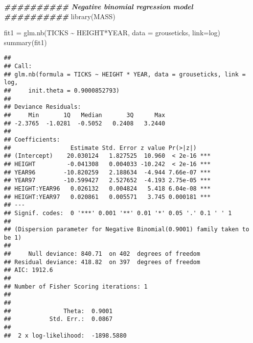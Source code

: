 \documentclass[
]{article}
\newenvironment{Shaded}{\begin{snugshade}}{\end{snugshade}}
\newcommand{\AttributeTok}[1]{\textcolor[rgb]{0.77,0.63,0.00}{#1}}
\newcommand{\CommentTok}[1]{\textcolor[rgb]{0.56,0.35,0.01}{\textit{#1}}}
\newcommand{\DocumentationTok}[1]{\textcolor[rgb]{0.56,0.35,0.01}{\textbf{\textit{#1}}}}
\newcommand{\FunctionTok}[1]{\textcolor[rgb]{0.00,0.00,0.00}{#1}}
\newcommand{\NormalTok}[1]{#1}
\newcommand{\OtherTok}[1]{\textcolor[rgb]{0.56,0.35,0.01}{#1}}
\newcommand{\SpecialCharTok}[1]{\textcolor[rgb]{0.00,0.00,0.00}{#1}}
\begin{document}
\begin{Shaded}
\begin{Highlighting}[]
\DocumentationTok{\#\#\#\#\#\#\#\#\#\# Negative binomial regression model \#\#\#\#\#\#\#\#\#\#}
\FunctionTok{library}\NormalTok{(MASS)}

\NormalTok{fit1 }\OtherTok{=} \FunctionTok{glm.nb}\NormalTok{(TICKS }\SpecialCharTok{\textasciitilde{}}\NormalTok{ HEIGHT}\SpecialCharTok{*}\NormalTok{YEAR, }\AttributeTok{data =}\NormalTok{ grouseticks, }\AttributeTok{link=}\NormalTok{log)}
\FunctionTok{summary}\NormalTok{(fit1)}
\end{Highlighting}
\end{Shaded}

\begin{verbatim}
## 
## Call:
## glm.nb(formula = TICKS ~ HEIGHT * YEAR, data = grouseticks, link = log, 
##     init.theta = 0.9000852793)
## 
## Deviance Residuals: 
##     Min       1Q   Median       3Q      Max  
## -2.3765  -1.0281  -0.5052   0.2408   3.2440  
## 
## Coefficients:
##                 Estimate Std. Error z value Pr(>|z|)    
## (Intercept)    20.030124   1.827525  10.960  < 2e-16 ***
## HEIGHT         -0.041308   0.004033 -10.242  < 2e-16 ***
## YEAR96        -10.820259   2.188634  -4.944 7.66e-07 ***
## YEAR97        -10.599427   2.527652  -4.193 2.75e-05 ***
## HEIGHT:YEAR96   0.026132   0.004824   5.418 6.04e-08 ***
## HEIGHT:YEAR97   0.020861   0.005571   3.745 0.000181 ***
## ---
## Signif. codes:  0 '***' 0.001 '**' 0.01 '*' 0.05 '.' 0.1 ' ' 1
## 
## (Dispersion parameter for Negative Binomial(0.9001) family taken to be 1)
## 
##     Null deviance: 840.71  on 402  degrees of freedom
## Residual deviance: 418.82  on 397  degrees of freedom
## AIC: 1912.6
## 
## Number of Fisher Scoring iterations: 1
## 
## 
##               Theta:  0.9001 
##           Std. Err.:  0.0867 
## 
##  2 x log-likelihood:  -1898.5880
\end{verbatim}

\begin{Shaded}
\end{Shaded}
\end{document}
